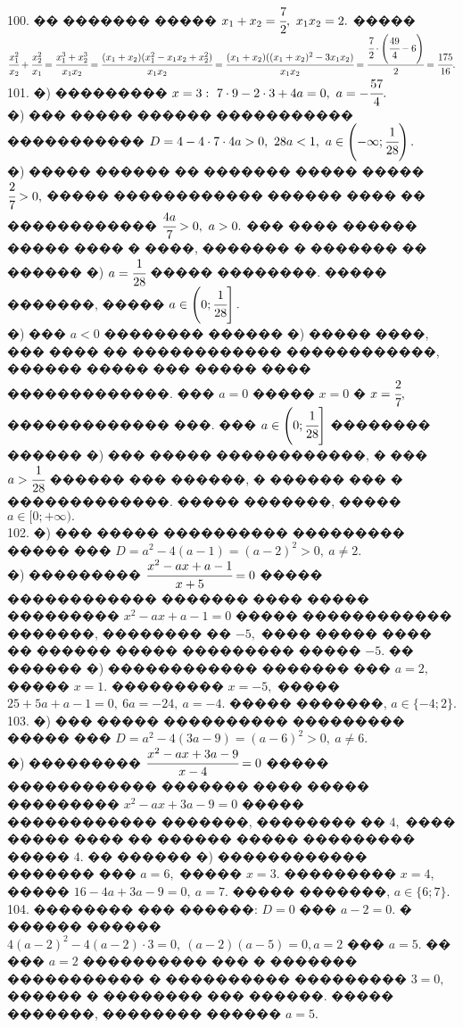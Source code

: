 \documentclass[12pt]{article}
\begin{document}
100. �� ������� ����� $x_1+x_2=\cfrac{7}{2},\ x_1x_2=2.$ ����� $\cfrac{x_1^2}{x_2}+\cfrac{x_2^2}{x_1}=\cfrac{x_1^3+x_2^3}{x_1x_2}=\cfrac{(x_1+x_2)(x_1^2-x_1x_2+x_2^2)}{x_1x_2}=
\cfrac{(x_1+x_2)((x_1+x_2)^2-3x_1x_2)}{x_1x_2}=\cfrac{\cfrac{7}{2}\cdot\left(\cfrac{49}{4}-6\right)}{2}=\cfrac{175}{16}.$\\
101. �) ��������� $x=3:\ 7\cdot9-2\cdot3+4a=0,\ a=-\cfrac{57}{4}.$\\
�) ��� ����� ������ ����������� ����������� $D=4-4\cdot7\cdot4a>0,\ 28a<1,\ a\in\left(-\infty;\cfrac{1}{28}\right).$\\
�) ����� ������ �� ������� ����� ����� $\cfrac{2}{7}>0,$ ����� ������������ ������ ���� �� ������������ $\cfrac{4a}{7}>0,\ a>0.$ ��� ���� ������ ����� ���� � ����, ������� � ������� �� ������ �) $a=\cfrac{1}{28}$ ����� ��������. ����� �������, ����� $a\in\left(0;\cfrac{1}{28}\right].$\\
�) ��� $a<0$ �������� ������ �) ����� ����, ��� ���� �� ������������ ������������, ������ ����� ��� ����� ���� �������������. ��� $a=0$ ����� $x=0$ � $x=\cfrac{2}{7},$ ������������� ���. ��� $a\in\left(0;\cfrac{1}{28}\right]$ �������� ������ �) ��� ����� ������������, � ��� $a>\cfrac{1}{28}$ ������ ��� ������, � ������ ��� � �������������. ����� �������, ����� $a\in[0;+\infty).$\\
102. �) ��� ����� ���������� ��������� ����� ��� $D=a^2-4(a-1)=(a-2)^2>0,\ a\neq2.$\\
�) ��������� $\cfrac{x^2-ax+a-1}{x+5}=0$ ����� ������������ ������� ���� ����� ��������� $x^2-ax+a-1=0$ ����� ������������ �������, �������� �� $-5,$ ���� ����� ���� �� ������ ����� ��������� ����� $-5.$ �� ������ �) ������������ ������� ��� $a=2,$ ����� $x=1.$ ��������� $x=-5,$ ����� $25+5a+a-1=0,\ 6a=-24,\ a=-4.$ ����� �������, $a\in\{-4;2\}.$\\
103. �) ��� ����� ���������� ��������� ����� ��� $D=a^2-4(3a-9)=(a-6)^2>0,\ a\neq6.$\\
�) ��������� $\cfrac{x^2-ax+3a-9}{x-4}=0$ ����� ������������ ������� ���� ����� ��������� $x^2-ax+3a-9=0$ ����� ������������ �������, �������� �� $4,$ ���� ����� ���� �� ������ ����� ��������� ����� $4.$ �� ������ �) ������������ ������� ��� $a=6,$ ����� $x=3.$ ��������� $x=4,$ ����� $16-4a+3a-9=0,\ a=7.$ ����� �������, $a\in\{6;7\}.$\\
104. �������� ��� ������: $D=0$ ��� $a-2=0.$ � ������ ������ $4(a-2)^2-4(a-2)\cdot3=0,\ (a-2)(a-5)=0, a=2$ ��� $a=5.$ �� ��� $a=2$ ���������� ��� � ������� ����������� � ���������� ��������� $3=0,$ ������ � �������� ��� ������. ����� �������, �������� ������ $a=5.$\\
\end{document}
